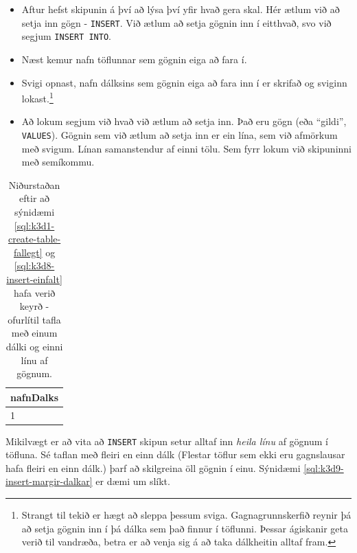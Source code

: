 \begin{itemize}
 \item Aftur hefst skipunin á því að lýsa því yfir hvað gera skal. Hér ætlum við að setja inn gögn - \verb|INSERT|. Við ætlum að setja gögnin inn í eitthvað, svo við segjum \verb|INSERT INTO|.
 \item Næst kemur nafn töflunnar sem gögnin eiga að fara í. %
 \item Svigi opnast, nafn dálksins sem gögnin eiga að fara inn í er skrifað og sviginn lokast.\footnote{Strangt til tekið er hægt að sleppa þessum sviga. Gagnagrunnskerfið reynir þá að setja gögnin inn í þá dálka sem það finnur í töflunni. Þessar ágiskanir geta verið til vandræða, betra er að venja sig á að taka dálkheitin alltaf fram.}
 \item Að lokum segjum við hvað við ætlum að setja inn. Það eru gögn (eða ``gildi'', \verb|VALUES|). Gögnin sem við ætlum að setja inn er ein lína, sem við afmörkum með svigum. Línan samanstendur af einni tölu. Sem fyrr lokum við skipuninni með semíkommu.
\end{itemize}

\begin{table}
\centering
\caption[Eftir einfalt INSERT]{Niðurstaðan eftir að sýnidæmi \ref{sql:k3d1-create-table-fallegt} og \ref{sql:k3d8-insert-einfalt} hafa verið keyrð - ofurlítil tafla með einum dálki og einni línu af gögnum.}
\label{tafla:insert-einfalt}
\begin{tabular}{l}
\toprule
nafnDalks\\
\midrule
1\\
\bottomrule
\end{tabular}
\end{table}

Mikilvægt er að vita að \verb|INSERT| skipun setur alltaf inn \emph{heila línu} af gögnum í töfluna. Sé taflan með fleiri en einn dálk (Flestar töflur sem ekki eru gagnslausar hafa fleiri en einn dálk.) þarf að skilgreina öll gögnin í einu. Sýnidæmi \ref{sql:k3d9-insert-margir-dalkar} er dæmi um slíkt.

\begin{example}
\caption[INSERT í tvo dálka í einu]{INSERT í tvo dálka í einu. Þessi skipun setur tölurnar $1$ og $2$ inn í sömu línu. Niðurstaðan er tafla \ref{tafla:insert-margir-dalkar}.}
\label{sql:k3d9-insert-margir-dalkar}
\centering
{}
\end{example}

